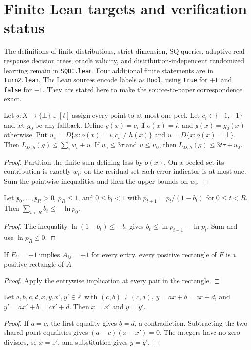 \section{Finite Lean targets and verification status}\label{app:lean}
The definitions of finite distributions, strict dimension, SQ queries, adaptive real-response decision trees, oracle validity, and distribution-independent randomized learning remain in \texttt{SQDC.lean}. Four additional finite statements are in \texttt{Turn2.lean}. The Lean sources encode labels as \texttt{Bool}, using \texttt{true} for $+1$ and \texttt{false} for $-1$. They are stated here to make the source-to-paper correspondence exact.

\begin{leanlemma}
Let $o:X\to\{\bot\}\cup[t]$ assign every point to at most one peel. Let $c_i\in\{-1,+1\}$ and let $g_0$ be any fallback. Define $g(x)=c_i$ if $o(x)=i$, and $g(x)=g_0(x)$ otherwise. Put $w_i=D\{x:o(x)=i,c_i\ne h(x)\}$ and $u=D\{x:o(x)=\bot\}$. Then $L_{D,h}(g)\le\sum_iw_i+u$. If $w_i\le3\tau$ and $u\le u_0$, then $L_{D,h}(g)\le3t\tau+u_0$.
\end{leanlemma}
\begin{proof}
Partition the finite sum defining loss by $o(x)$. On a peeled set its contribution is exactly $w_i$; on the residual set each error indicator is at most one. Sum the pointwise inequalities and then the upper bounds on $w_i$.
\end{proof}
\begin{leanlemma}
Let $p_0,\ldots,p_R>0$, $p_R\le1$, and $0\le b_t<1$ with $p_{t+1}=p_t/(1-b_t)$ for $0\le t<R$. Then $\sum_{t<R}b_t\le-\ln p_0$.
\end{leanlemma}
\begin{proof}
The inequality $\ln(1-b_t)\le-b_t$ gives $b_t\le\ln p_{t+1}-\ln p_t$. Sum and use $\ln p_R\le0$.
\end{proof}
\begin{leanlemma}
If $F_{ij}=+1$ implies $A_{ij}=+1$ for every entry, every positive rectangle of $F$ is a positive rectangle of $A$.
\end{leanlemma}
\begin{proof}
Apply the entrywise implication at every pair in the rectangle.
\end{proof}
\begin{leanlemma}
Let $a,b,c,d,x,y,x',y'\in\mathbb Z$ with $(a,b)\ne(c,d)$, $y=ax+b=cx+d$, and $y'=ax'+b=cx'+d$. Then $x=x'$ and $y=y'$.
\end{leanlemma}
\begin{proof}
If $a=c$, the first equality gives $b=d$, a contradiction. Subtracting the two shared-point equalities gives $(a-c)(x-x')=0$. The integers have no zero divisors, so $x=x'$, and substitution gives $y=y'$.
\end{proof}

